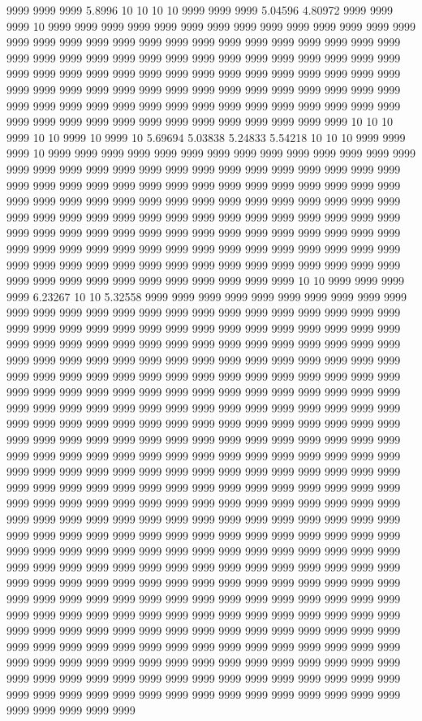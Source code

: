 9999 9999 9999 5.8996 10 10 10 10 9999 9999 9999 5.04596 4.80972 9999 9999 9999 10 9999 9999 9999 9999 9999 9999 9999 9999 9999 9999 9999 9999 9999 9999 9999 9999 9999 9999 9999 9999 9999 9999 9999 9999 9999 9999 9999 9999 9999 9999 9999 9999 9999 9999 9999 9999 9999 9999 9999 9999 9999 9999 9999 9999 9999 9999 9999 9999 9999 9999 9999 9999 9999 9999 9999 9999 9999 9999 9999 9999 9999 9999 9999 9999 9999 9999 9999 9999 9999 9999 9999 9999 9999 9999 9999 9999 9999 9999 9999 9999 9999 9999 9999 9999 9999 9999 9999 9999 9999 9999 9999 9999 9999 9999 9999 9999 9999 9999 9999 9999 9999 9999 10 10 10 9999 10 10 9999 10 9999 10 5.69694 5.03838 5.24833 5.54218 10 10 10 9999 9999 9999 10 9999 9999 9999 9999 9999 9999 9999 9999 9999 9999 9999 9999 9999 9999 9999 9999 9999 9999 9999 9999 9999 9999 9999 9999 9999 9999 9999 9999 9999 9999 9999 9999 9999 9999 9999 9999 9999 9999 9999 9999 9999 9999 9999 9999 9999 9999 9999 9999 9999 9999 9999 9999 9999 9999 9999 9999 9999 9999 9999 9999 9999 9999 9999 9999 9999 9999 9999 9999 9999 9999 9999 9999 9999 9999 9999 9999 9999 9999 9999 9999 9999 9999 9999 9999 9999 9999 9999 9999 9999 9999 9999 9999 9999 9999 9999 9999 9999 9999 9999 9999 9999 9999 9999 9999 9999 9999 9999 9999 9999 9999 9999 9999 9999 9999 9999 9999 9999 9999 9999 9999 9999 9999 9999 9999 9999 9999 9999 9999 9999 9999 10 10 9999 9999 9999 9999 6.23267 10 10 5.32558 9999 9999 9999 9999 9999 9999 9999 9999 9999 9999 9999 9999 9999 9999 9999 9999 9999 9999 9999 9999 9999 9999 9999 9999 9999 9999 9999 9999 9999 9999 9999 9999 9999 9999 9999 9999 9999 9999 9999 9999 9999 9999 9999 9999 9999 9999 9999 9999 9999 9999 9999 9999 9999 9999 9999 9999 9999 9999 9999 9999 9999 9999 9999 9999 9999 9999 9999 9999 9999 9999 9999 9999 9999 9999 9999 9999 9999 9999 9999 9999 9999 9999 9999 9999 9999 9999 9999 9999 9999 9999 9999 9999 9999 9999 9999 9999 9999 9999 9999 9999 9999 9999 9999 9999 9999 9999 9999 9999 9999 9999 9999 9999 9999 9999 9999 9999 9999 9999 9999 9999 9999 9999 9999 9999 9999 9999 9999 9999 9999 9999 9999 9999 9999 9999 9999 9999 9999 9999 9999 9999 9999 9999 9999 9999 9999 9999 9999 9999 9999 9999 9999 9999 9999 9999 9999 9999 9999 9999 9999 9999 9999 9999 9999 9999 9999 9999 9999 9999 9999 9999 9999 9999 9999 9999 9999 9999 9999 9999 9999 9999 9999 9999 9999 9999 9999 9999 9999 9999 9999 9999 9999 9999 9999 9999 9999 9999 9999 9999 9999 9999 9999 9999 9999 9999 9999 9999 9999 9999 9999 9999 9999 9999 9999 9999 9999 9999 9999 9999 9999 9999 9999 9999 9999 9999 9999 9999 9999 9999 9999 9999 9999 9999 9999 9999 9999 9999 9999 9999 9999 9999 9999 9999 9999 9999 9999 9999 9999 9999 9999 9999 9999 9999 9999 9999 9999 9999 9999 9999 9999 9999 9999 9999 9999 9999 9999 9999 9999 9999 9999 9999 9999 9999 9999 9999 9999 9999 9999 9999 9999 9999 9999 9999 9999 9999 9999 9999 9999 9999 9999 9999 9999 9999 9999 9999 9999 9999 9999 9999 9999 9999 9999 9999 9999 9999 9999 9999 9999 9999 9999 9999 9999 9999 9999 9999 9999 9999 9999 9999 9999 9999 9999 9999 9999 9999 9999 9999 9999 9999 9999 9999 9999 9999 9999 9999 9999 9999 9999 9999 9999 9999 9999 9999 9999 9999 9999 9999 9999 9999 9999 9999 9999 9999 9999 9999 9999 9999 9999 9999 9999 9999 9999 9999 9999 9999 9999 9999 9999 9999 9999 9999 9999 9999 9999 9999 9999 9999 9999 9999 9999 9999 9999 9999 9999 9999 9999 9999 9999 9999 9999 9999 